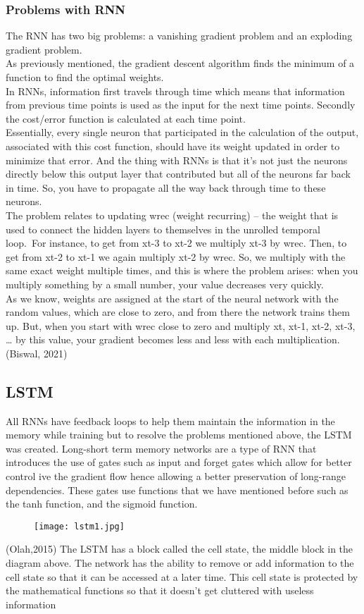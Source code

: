 \documentclass{article}
\begin{document}
\subsubsection{Problems with RNN}
The RNN has two big problems: a vanishing gradient problem and an exploding gradient
problem.\\
As previously mentioned, the gradient descent algorithm finds the minimum of a function to
find the optimal weights.\\
In RNNs, information first travels through time which means that information from previous
time points is used as the input for the next time points. Secondly the cost/error function is
calculated at each time point.\\
Essentially, every single neuron that participated in the calculation of the output, associated with
this cost function, should have its weight updated in order to minimize that error. And the thing
with RNNs is that it’s not just the neurons directly below this output layer that contributed but
all of the neurons far back in time. So, you have to propagate all the way back through time to
these neurons.\\
The problem relates to updating wrec (weight recurring) – the weight that is used to connect the
hidden layers to themselves in the unrolled temporal loop.\
For instance, to get from xt-3 to xt-2 we multiply xt-3 by wrec. Then, to get from xt-2 to xt-1 we
again multiply xt-2 by wrec. So, we multiply with the same exact weight multiple times, and this
is where the problem arises: when you multiply something by a small number, your value
decreases very quickly.\\
As we know, weights are assigned at the start of the neural network with the random values,
which are close to zero, and from there the network trains them up. But, when you start with
wrec close to zero and multiply xt, xt-1, xt-2, xt-3, … by this value, your gradient becomes less
and less with each multiplication.\\
(Biswal, 2021)

\subsection{LSTM}
All RNNs have feedback loops to help them maintain the information in the memory while
training but to resolve the problems mentioned above, the LSTM was created.
Long-short term memory networks are a type of RNN that introduces the use of gates such as
input and forget gates which allow for better control ive the gradient flow hence allowing a
better preservation of long-range dependencies. These gates use functions that we have
mentioned before such as the tanh function, and the sigmoid function.
\begin{figure}[h!]
    \centering
    \texttt{[image: lstm1.jpg]}
    \caption{}
\end{figure}
(Olah,2015)
The LSTM has a block called the cell state, the middle block in the diagram above. The network
has the ability to remove or add information to the cell state so that it can be accessed at a later
time. This cell state is protected by the mathematical functions so that it doesn’t get cluttered
with useless information
\end{document}

